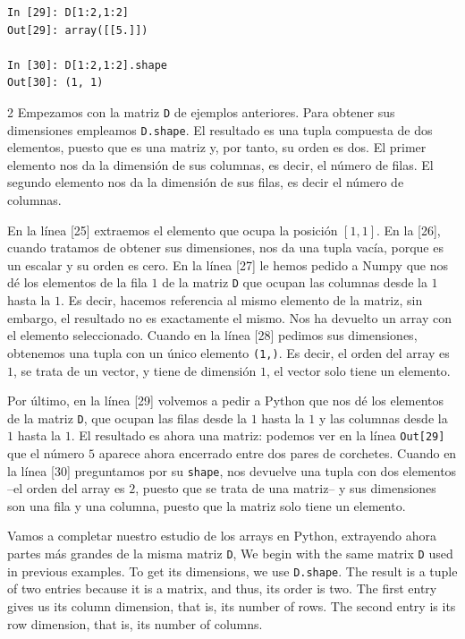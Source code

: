 \begin{center}
    \begin{minipage}{0.3\textwidth}
    \begin{verbatim}
In [29]: D[1:2,1:2]
Out[29]: array([[5.]])

In [30]: D[1:2,1:2].shape
Out[30]: (1, 1)
    \end{verbatim}
        
    \end{minipage}
\end{center}

 \begin{paracol}{2}
 Empezamos con la matriz \texttt{D} de ejemplos anteriores. Para obtener sus dimensiones empleamos \texttt{D.shape}. El resultado es una tupla compuesta de dos elementos, puesto que es una matriz y, por tanto, su orden es dos. El primer elemento nos da la dimensión de sus columnas, es decir, el número de filas. El segundo elemento nos da la dimensión de sus filas, es decir el número de columnas. 
 
 En la línea [25] extraemos el elemento que ocupa la posición $[1,1]$. En la [26], cuando tratamos de obtener sus dimensiones, nos da una tupla vacía, porque es un escalar y su orden es cero. En la línea [27] le hemos pedido a Numpy que nos dé los elementos de la fila $1$ de la matriz \texttt{D} que ocupan las columnas desde la $1$ hasta la $1$. Es decir, hacemos referencia al mismo elemento de la matriz, sin embargo, el resultado no es exactamente el mismo. Nos ha devuelto un array con el elemento seleccionado. Cuando en la línea [28] pedimos sus dimensiones, obtenemos una tupla con un único elemento \texttt{(1,)}. Es decir, el orden del array es $1$, se trata de un vector, y tiene de dimensión $1$, el vector solo tiene un elemento. 
 
 Por último, en la línea [29] volvemos a pedir a Python que nos dé los elementos de la matriz \texttt{D}, que ocupan las filas desde la $1$ hasta la $1$ y las columnas desde la $1$ hasta la $1$. El resultado es ahora una matriz: podemos ver en la línea \texttt{Out[29]} que el número $5$ aparece ahora encerrado entre dos pares de corchetes. Cuando en la línea [30] preguntamos por su \texttt{shape}, nos devuelve una tupla con dos elementos --el orden del array es $2$, puesto que se trata de una matriz-- y sus dimensiones son una fila y una columna, puesto que la matriz solo tiene un elemento.  

 Vamos a completar nuestro estudio de los arrays en Python, extrayendo ahora partes más grandes de la misma matriz \texttt{D},
 \switchcolumn
 We begin with the same matrix \texttt{D} used in previous examples. To get its dimensions, we use \texttt{D.shape}. The result is a tuple of two entries because it is a matrix, and thus, its order is two. The first entry gives us its column dimension, that is, its number of rows. The second entry is its row dimension, that is, its number of columns.


\end{paracol}
